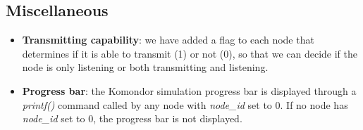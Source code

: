 \documentclass[a4paper]{article}
\begin{document}
\subsection{Miscellaneous}
\label{section:development_miscellany}
\begin{itemize}
	\item \textbf{Transmitting capability}: we have added a flag to each node that determines if it is able to transmit (1) or not (0), so that we can decide if the node is only listening or both transmitting and listening.
	\item \textbf{Progress bar}: the Komondor simulation progress bar is displayed through a \textit{printf()} command called by any node with \textit{node\_id} set to 0. If no node has \textit{node\_id} set to 0, the progress bar is not displayed.
\end{itemize}



\end{document}

